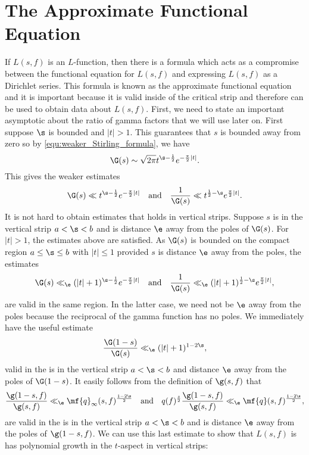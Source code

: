   \section{The Approximate Functional Equation}
    If $L(s,f)$ is an $L$-function, then there is a formula which acts as a compromise between the functional equation for $L(s,f)$ and expressing $L(s,f)$ as a Dirichlet series. This formula is known as the approximate functional equation and it is important because it is valid inside of the critical strip and therefore can be used to obtain data about $L(s,f)$. First, we need to state an important asymptotic about the ratio of gamma factors that we will use later on. First suppose $\s$ is bounded and $|t| > 1$. This guarantees that $s$ is bounded away from zero so by \cref{equ:weaker_Stirling_formula}, we have
    \[
      \G(s) \sim \sqrt{2\pi}t^{\s-\frac{1}{2}}e^{-\frac{\pi}{2}|t|}.
    \]
    This gives the weaker estimates
    \[
      \G(s) \ll t^{\s-\frac{1}{2}}e^{-\frac{\pi}{2}|t|} \quad \text{and} \quad \frac{1}{\G(s)} \ll t^{\frac{1}{2}-\s}e^{\frac{\pi}{2}|t|} .
    \]
    It is not hard to obtain estimates that holds in vertical strips. Suppose $s$ is in the vertical strip $a < \s < b$ and is distance $\e$ away from the poles of $\G(s)$. For $|t| > 1$, the estimates above are satisfied. As $\G(s)$ is bounded on the compact region $a \le \s \le b$ with $|t| \le 1$ provided $s$ is distance $\e$ away from the poles, the estimates
    \begin{equation}\label{equ:modified_gamma_estimates}
      \G(s) \ll_{\e} (|t|+1)^{\s-\frac{1}{2}}e^{-\frac{\pi}{2}|t|} \quad \text{and} \quad \frac{1}{\G(s)} \ll_{\e} (|t|+1)^{\frac{1}{2}-\s}e^{\frac{\pi}{2}|t|},
    \end{equation}
    are valid in the same region. In the latter case, we need not be $\e$ away from the poles because the reciprocal of the gamma function has no poles. We immediately have the useful estimate
    \[
      \frac{\G(1-s)}{\G(s)} \ll_{\e} (|t|+1)^{1-2\s},
    \]
    valid in the is in the vertical strip $a < \s < b$ and distance $\e$ away from the poles of $\G(1-s)$. It easily follows from the definition of $\g(s,f)$ that
    \begin{equation}\label{equ:gamma_factor_analytic_conductor_estimate}
      \frac{\g(1-s,f)}{\g(s,f)} \ll_{\e} \mf{q}_{\infty}(s,f)^{\frac{1-2\s}{2}} \quad \text{and} \quad q(f)^{\frac{s}{2}}\frac{\g(1-s,f)}{\g(s,f)} \ll_{\e} \mf{q}(s,f)^{\frac{1-2\s}{2}},
    \end{equation}
    are valid in the is in the vertical strip $a < \s < b$ and is distance $\e$ away from the poles of $\g(1-s,f)$. We can use this last estimate to show that $L(s,f)$ is has polynomial growth in the $t$-aspect in vertical strips:

